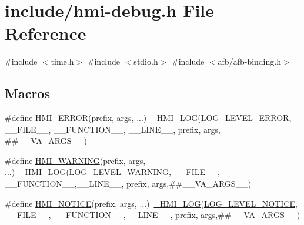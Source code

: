 \hypertarget{hmi-debug_8h}{}\section{include/hmi-\/debug.h File Reference}
\label{hmi-debug_8h}
{\ttfamily \#include $<$time.\+h$>$}\newline
{\ttfamily \#include $<$stdio.\+h$>$}\newline
{\ttfamily \#include $<$afb/afb-\/binding.\+h$>$}\newline
\subsection*{Macros}
\begin{DoxyCompactItemize}
\item 
\#define \hyperlink{hmi-debug_8h_a65bb6c7cfe38f8a724beab5059d36fb2}{H\+M\+I\+\_\+\+E\+R\+R\+OR}(prefix,  args, ...)~\hyperlink{hmi-debug_8h_a0846b9d51e2e0612c4825a9a581aa40a}{\+\_\+\+H\+M\+I\+\_\+\+L\+OG}(\hyperlink{hmi-debug_8h_aa5a9053636a30269210c54e734e0d583a5b40f003febbc3b535649d63f4b8a44f}{L\+O\+G\+\_\+\+L\+E\+V\+E\+L\+\_\+\+E\+R\+R\+OR}, \+\_\+\+\_\+\+F\+I\+L\+E\+\_\+\+\_\+, \+\_\+\+\_\+\+F\+U\+N\+C\+T\+I\+O\+N\+\_\+\+\_\+, \+\_\+\+\_\+\+L\+I\+N\+E\+\_\+\+\_\+, prefix, args, \#\#\+\_\+\+\_\+\+V\+A\+\_\+\+A\+R\+G\+S\+\_\+\+\_\+)
\item 
\#define \hyperlink{hmi-debug_8h_a25361812432cd2480bc8f1a8e56ecbf7}{H\+M\+I\+\_\+\+W\+A\+R\+N\+I\+NG}(prefix,  args, ...)~\hyperlink{hmi-debug_8h_a0846b9d51e2e0612c4825a9a581aa40a}{\+\_\+\+H\+M\+I\+\_\+\+L\+OG}(\hyperlink{hmi-debug_8h_aa5a9053636a30269210c54e734e0d583a5b4dd81b4dc7eefbc55ba03415c627ef}{L\+O\+G\+\_\+\+L\+E\+V\+E\+L\+\_\+\+W\+A\+R\+N\+I\+NG}, \+\_\+\+\_\+\+F\+I\+L\+E\+\_\+\+\_\+, \+\_\+\+\_\+\+F\+U\+N\+C\+T\+I\+O\+N\+\_\+\+\_\+,\+\_\+\+\_\+\+L\+I\+N\+E\+\_\+\+\_\+, prefix, args,\#\#\+\_\+\+\_\+\+V\+A\+\_\+\+A\+R\+G\+S\+\_\+\+\_\+)
\item 
\#define \hyperlink{hmi-debug_8h_abc0d6e0760017d8ae48b836925b2ef15}{H\+M\+I\+\_\+\+N\+O\+T\+I\+CE}(prefix,  args, ...)~\hyperlink{hmi-debug_8h_a0846b9d51e2e0612c4825a9a581aa40a}{\+\_\+\+H\+M\+I\+\_\+\+L\+OG}(\hyperlink{hmi-debug_8h_aa5a9053636a30269210c54e734e0d583a23ae4d711a7bbb3900240cb7316b4b4e}{L\+O\+G\+\_\+\+L\+E\+V\+E\+L\+\_\+\+N\+O\+T\+I\+CE}, \+\_\+\+\_\+\+F\+I\+L\+E\+\_\+\+\_\+, \+\_\+\+\_\+\+F\+U\+N\+C\+T\+I\+O\+N\+\_\+\+\_\+,\+\_\+\+\_\+\+L\+I\+N\+E\+\_\+\+\_\+, prefix, args,\#\#\+\_\+\+\_\+\+V\+A\+\_\+\+A\+R\+G\+S\+\_\+\+\_\+)

\end{DoxyCompactItemize}

